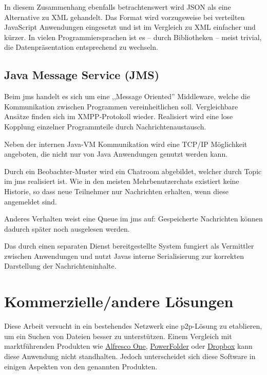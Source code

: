 \documentclass[oneside, ngerman, toc=bibliography,bibliography=totoc,listof=entryprefix, open=right,numbers=noenddot,fontsize=12pt]{scrbook}
\begin{document}
In diesem Zusammenhang ebenfalls betrachtenswert wird {JSON} als eine Alternative zu {XML} gehandelt. Das Format wird vorzugsweise bei verteilten JavaScript Anwendungen eingesetzt und ist im Vergleich zu {XML} einfacher und kürzer. In vielen Programmiersprachen ist es -- durch Bibliotheken -- meist trivial, die Datenpräsentation entsprechend zu wechseln.


\subsection{Java Message Service (JMS)}
\label{chap:jms}
Beim \acrfull{jms} handelt es sich um eine ,,Message Oriented'' Middleware, welche die Kommunikation zwischen Programmen vereinheitlichen soll. Vergleichbare Ansätze finden sich im XMPP-Protokoll wieder. Realisiert wird eine lose Kopplung einzelner Programmteile durch Nachrichtenaustausch.

Neben der internen Java-VM Kommunikation wird eine {TCP/IP} Möglichkeit angeboten, die nicht nur von Java Anwendungen genutzt werden kann.

\bigskip

Durch ein Beobachter-Muster  wird ein Chatroom abgebildet, welcher durch Topic im  \acrshort{jms} realisiert ist.
Wie in den meisten Mehrbenutzerchats existiert keine Historie, so dass neue Teilnehmer nur Nachrichten erhalten, wenn diese angemeldet sind.

Anderes Verhalten weist eine Queue im \acrshort{jms} auf: Gespeicherte Nachrichten können dadurch später noch ausgelesen werden.

Das durch einen separaten Dienst bereitgestellte System fungiert als Vermittler zwischen Anwendungen und nutzt Javas interne Serialisierung zur korrekten Darstellung der Nachrichteninhalte.
 


\section{Kommerzielle/andere Lösungen}
Diese Arbeit versucht in ein bestehendes Netzwerk eine \acrshort{p2p}-Lösung zu etablieren, um ein Suchen von Dateien besser zu unterstützen. Einem Vergleich mit marktführenden Produkten wie  \href{http://www.alfresco.com/}{{Alfresco One}}, \href{https://www.powerfolder.com/de/powerfolder-erhalt-qualitatssiegel-it-security-made-in-germany/}{{PowerFolder}} oder \href{https://www.dropbox.com/de/}{{Dropbox}} kann diese Anwendung nicht standhalten.
Jedoch unterscheidet sich diese Software in einigen Aspekten von den genannten Produkten.
\end{document}
